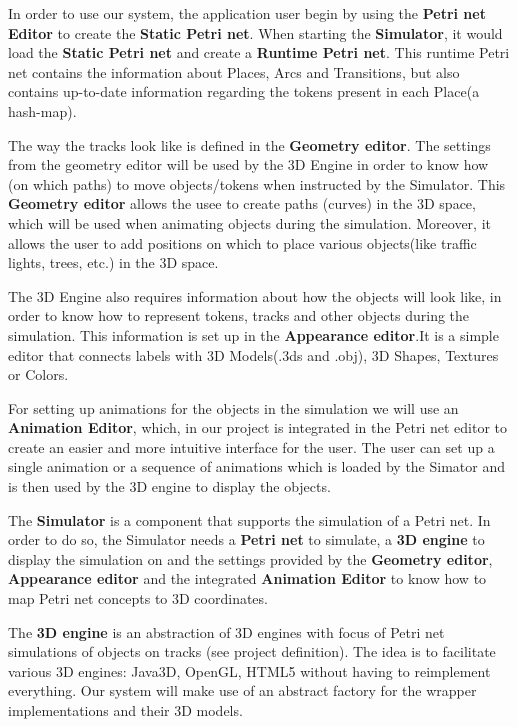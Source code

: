 In order to use our system, the application user begin by using the \textbf{Petri net Editor}
to create the \textbf{Static Petri net}. When starting the \textbf{Simulator}, it would load
the \textbf{Static Petri net} and create a \textbf{Runtime Petri net}. This runtime Petri net
contains the information about Places, Arcs and Transitions, but also contains up-to-date information 
regarding the tokens present in each Place(a hash-map).

The way the tracks look like is defined in the \textbf{Geometry editor}. The settings from the geometry 
editor will be used by the 3D Engine in order to know how (on which paths) to move objects/tokens when instructed by the
Simulator. This \textbf{Geometry editor} allows the usee to create paths (curves) in the 3D space, which will
be used when animating objects during the simulation. Moreover, it allows the user to add positions on
which to place various objects(like traffic lights, trees, etc.) in the 3D space.

The 3D Engine also requires information about how the objects will look like, in order
to know how to represent tokens, tracks and other objects during the simulation. This information is set up in 
the \textbf{Appearance editor}.It is a simple editor that connects labels with 3D Models(.3ds and .obj), 
3D Shapes, Textures or Colors.

For setting up animations for the objects in the simulation we will use an \textbf{Animation Editor},
which, in our project is integrated in the Petri net editor to create an easier and more intuitive 
interface for the user. The user can set up a single animation or a sequence of animations which is
loaded by the Simator and is then used by the 3D engine to display the objects.

The \textbf{Simulator} is a component that supports the simulation of a Petri net.
In order to do so, the Simulator needs a \textbf{Petri net} to simulate, a
\textbf{3D engine} to display the simulation on and the settings provided by the \textbf{Geometry editor}, 
\textbf{Appearance editor} and the integrated \textbf{Animation Editor} to know how to map
Petri net concepts to 3D coordinates.

The \textbf{3D engine} is an abstraction of 3D engines with focus of Petri net simulations of
objects on tracks (see project definition). The idea is to facilitate various 3D engines: Java3D,
OpenGL, HTML5 without having to reimplement everything. Our system will make use of an abstract factory for
the wrapper implementations and their 3D models.

